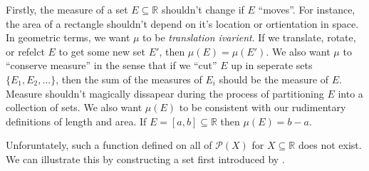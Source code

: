 \documentclass{article}
\newcommand{\R}{\mathbb{R}}
\theoremstyle{definition}
\begin{document}
	Firstly, the measure of a set $E\subseteq \R$ shouldn't change if $E$ ``moves''.  For instance, the area of a rectangle shouldn't depend on it's location or ortientation in space. In geometric terms, we want $\mu$ to be \textit{translation ivarient}. If we translate, rotate, or refelct $E$ to get some new set $E'$, then $\mu(E)=\mu(E')$. We also want $\mu$ to ``conserve measure'' in the sense that if we ``cut'' $E$ up in seperate sets $\{E_1,E_2,\ldots\}$, then the sum of the measures of $E_i$ should be the measure of $E$. Measure shouldn't magically dissapear during the process of partitioning $E$ into a collection of sets. We also want $\mu(E)$ to be consistent with our rudimentary definitions of length and area. If $E=[a,b]\subseteq \R$ then $\mu(E)=b-a$. 
	
	Unforuntately, such a function defined on all of $\mathcal P(X)$ for $X\subseteq \R$ does not exist. We can illustrate this by constructing a set first introduced by \cite{vitali1905sul}. 
	
\end{document}
